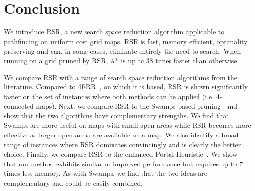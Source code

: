\section{Conclusion}
We introduce RSR, a new search space reduction algorithm applicable to
pathfinding on uniform cost grid maps. RSR is fast, memory efficient,
optimality preserving and can, in some cases, eliminate entirely the need
to search.  
When running on a grid pruned by RSR, A* is up to 38 times faster than
otherwise.
\par
We compare RSR with a range of search space reduction algorithms from the
literature. Compared to 4ERR~\cite{harabor10}, on which it is based, RSR is
shown significantly faster on the set of instances where both methods can be
applied (i.e. 4-connected maps).  Next, we compare RSR to the Swamps-based
pruning~\cite{pochter10} and show that the two algorithms have complementary
strengths.  We find that Swamps are more useful on maps with small open areas
while RSR becomes more effective as larger open areas are available on a map. We
also identify a broad range of instances where RSR dominates convincingly and is
clearly the better choice.  Finally, we compare RSR to the enhanced Portal
Heuristic~\cite{goldenberg10}.  We show that our method exhibits similar or
improved performance but requires up to 7 times less memory.  As with Swamps, we
find that the two ideas are complementary and could be easily combined.




